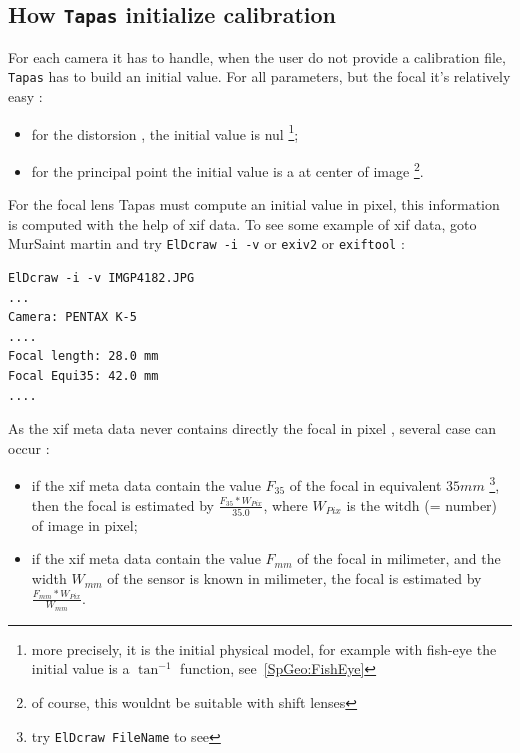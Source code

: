 \subsection{How {\tt Tapas} initialize calibration}

For each camera it has to handle, when the user do not provide a calibration
file, {\tt Tapas} has to build an initial  value. For all parameters, but the
focal it's relatively easy :

\begin{itemize}
  \item for the distorsion , the initial value is nul \footnote{more
        precisely, it is the initial physical model, for example 
        with fish-eye the initial value is a $\tan^{-1} $ function, see~\ref{SpGeo:FishEye}};

  \item for the principal point the initial value is a at center of image 
        \footnote{ of course, this wouldnt  be suitable with shift lenses}.
\end{itemize}

For the focal lens Tapas must compute an initial value in pixel, this information is 
computed with the help of xif data. To see some example of xif data, goto MurSaint martin
and try {\tt ElDcraw -i -v} or {\tt exiv2} or {\tt exiftool} :

\begin{verbatim}
ElDcraw -i -v IMGP4182.JPG
...
Camera: PENTAX K-5
....
Focal length: 28.0 mm
Focal Equi35: 42.0 mm
....
\end{verbatim}

As the xif meta data never contains directly the focal in pixel , 
several case can  occur :

\begin{itemize}
  \item if the xif meta data contain the value $F_{35}$ of the focal in equivalent $35mm$  
       \footnote{try {\tt ElDcraw FileName} to see}, then the focal is estimated by
       $\frac{F_{35} * W_{Pix}}{35.0}$, where $W_{Pix}$ is the witdh (= number) 
       of image in pixel;

  \item if the xif meta data contain the value $F_{mm}$ of the focal in milimeter, 
        and the width  $W_{mm}$  of the sensor is known  in milimeter, the focal is estimated
        by $\frac{F_{mm} * W_{Pix}}{W_{mm}}$.

\end{itemize}

